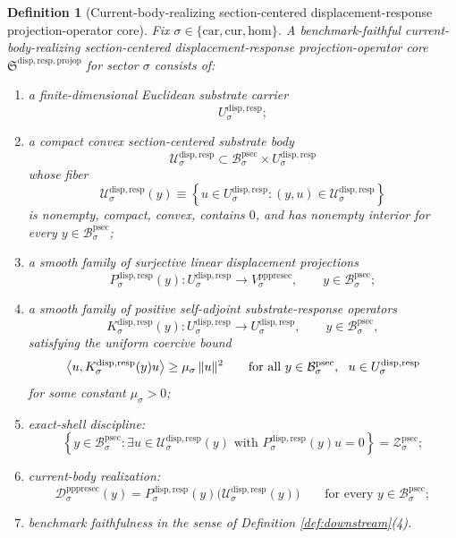 \documentclass[11pt]{article}
\newcommand{\Car}{\mathrm{car}}
\newcommand{\Cur}{\mathrm{cur}}
\newcommand{\Hom}{\mathrm{hom}}
\newcommand{\ProtoSectionBody}[1]{\mathcal B_{#1}^{\mathrm{psec}}}
\newcommand{\ProtoSectionShell}[1]{\mathcal Z_{#1}^{\mathrm{psec}}}
\newcommand{\PrePreProtoSectionVertical}[1]{V_{#1}^{\mathrm{pppresec}}}
\newcommand{\PrePreProtoSectionResidualBody}[1]{\mathcal D_{#1}^{\mathrm{pppresec}}}
\newcommand{\ProjectionOperatorCore}{\mathfrak S^{\mathrm{disp,resp,projop}}}
\newcommand{\SubstrateCarrier}[1]{U_{#1}^{\mathrm{disp,resp}}}
\newcommand{\SubstrateBody}[1]{\mathcal U_{#1}^{\mathrm{disp,resp}}}
\newcommand{\SubstrateProjection}[1]{P_{#1}^{\mathrm{disp,resp}}}
\newcommand{\SubstrateOperator}[1]{K_{#1}^{\mathrm{disp,resp}}}
\newtheorem{definition}{Definition}
\begin{document}
\begin{definition}[Current-body-realizing section-centered displacement-response projection-operator core]
\label{def:core}
Fix \(\sigma\in\{\Car,\Cur,\Hom\}\). A \emph{benchmark-faithful current-body-realizing section-centered displacement-response projection-operator core} \(\ProjectionOperatorCore\) for sector \(\sigma\) consists of:
\begin{enumerate}
    \item a finite-dimensional Euclidean substrate carrier
    \[
    \SubstrateCarrier{\sigma};
    \]
    \item a compact convex section-centered substrate body
    \[
    \SubstrateBody{\sigma}
    \subset
    \ProtoSectionBody{\sigma}\times\SubstrateCarrier{\sigma}
    \]
    whose fiber
    \[
    \SubstrateBody{\sigma}(y)
    \equiv
    \left\{
    u\in\SubstrateCarrier{\sigma}:(y,u)\in\SubstrateBody{\sigma}
    \right\}
    \]
    is nonempty, compact, convex, contains \(0\), and has nonempty interior for every \(y\in\ProtoSectionBody{\sigma}\);
    \item a smooth family of surjective linear displacement projections
    \[
    \SubstrateProjection{\sigma}(y):
    \SubstrateCarrier{\sigma}\to\PrePreProtoSectionVertical{\sigma},
    \qquad
    y\in\ProtoSectionBody{\sigma};
    \]
    \item a smooth family of positive self-adjoint substrate-response operators
    \[
    \SubstrateOperator{\sigma}(y):
    \SubstrateCarrier{\sigma}\to\SubstrateCarrier{\sigma},
    \qquad
    y\in\ProtoSectionBody{\sigma},
    \]
    satisfying the uniform coercive bound
    \begin{equation}
    \ev{u,\SubstrateOperator{\sigma}(y)u}
    \ge
    \mu_{\sigma}\,\|u\|^2
    \qquad
    \text{for all }
    y\in\ProtoSectionBody{\sigma},
    \ \ u\in\SubstrateCarrier{\sigma}
    \label{eq:coercive}
    \end{equation}
    for some constant \(\mu_{\sigma}>0\);
    \item exact-shell discipline:
    \[
    \left\{
    y\in\ProtoSectionBody{\sigma}:
    \exists u\in\SubstrateBody{\sigma}(y)
    \text{ with }
    \SubstrateProjection{\sigma}(y)u=0
    \right\}
    =
    \ProtoSectionShell{\sigma};
    \]
    \item current-body realization:
    \begin{equation}
    \PrePreProtoSectionResidualBody{\sigma}(y)
    =
    \SubstrateProjection{\sigma}(y)\bigl(\SubstrateBody{\sigma}(y)\bigr)
    \qquad
    \text{for every }
    y\in\ProtoSectionBody{\sigma};
    \label{eq:realizing}
    \end{equation}
    \item benchmark faithfulness in the sense of Definition \ref{def:downstream}(4).
\end{enumerate}
\end{definition}
\end{document}
